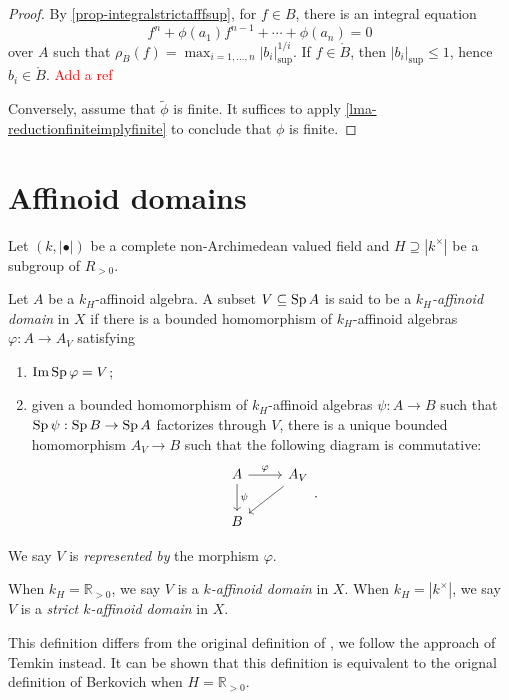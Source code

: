 \begin{proof}
    By \cref{prop-integralstrictafffsup}, for $f\in B$, there is an integral equation 
    \[
        f^n+\phi(a_1)f^{n-1}+\cdots+\phi(a_n)=0
    \]
    over $A$ such that $\rho_B(f)=\max_{i=1,\ldots,n}|b_i|_{\sup}^{1/i}$. If $f\in \mathring{B}$, then $|b_i|_{\sup}\leq 1$, hence $b_i\in \mathring{B}$. \textcolor{red}{Add a ref}

    Conversely, assume that $\tilde{\phi}$ is finite. It suffices to apply \cref{lma-reductionfiniteimplyfinite} to conclude that $\phi$ is finite.
\end{proof}


\section{Affinoid domains}
Let $(k,|\bullet|)$ be a complete non-Archimedean valued field and $H\supseteq |k^{\times}|$ be a subgroup of $R_{>0}$.

\begin{definition}\label{def-affinoiddomain}
    Let $A$ be a $k_H$-affinoid algebra. A subset $V\subseteq \operatorname{Sp} A$ is said to be a \emph{$k_H$-affinoid domain} in $X$ if there is a bounded homomorphism of $k_H$-affinoid algebras $\varphi:A\rightarrow A_V$ satisfying 
    \begin{enumerate}
        \item $\operatorname{Im} \operatorname{Sp}\varphi=V$;
        \item given a bounded homomorphism of $k_H$-affinoid algebras $\psi:A\rightarrow B$ such that $\operatorname{Sp} \psi:\operatorname{Sp} B\rightarrow \operatorname{Sp} A$ factorizes through $V$, there is a unique bounded homomorphism $A_V\rightarrow B$ such that the following diagram is commutative:
        \[
            \begin{tikzcd}
                A \arrow[r, "\varphi"] \arrow[d, "\psi"] & A_V \arrow[ld] \\
                B                                        &               
            \end{tikzcd}.
        \]
    \end{enumerate}
    We say $V$ is \emph{represented by} the morphism $\varphi$.

    When $k_H=\mathbb{R}_{>0}$, we say $V$ is a \emph{$k$-affinoid domain} in $X$. When $k_H=|k^{\times}|$, we say $V$ is a \emph{strict $k$-affinoid domain} in $X$.
\end{definition}
\begin{remark}
    This definition differs from the original definition of \cite{Berk12}, we follow the approach of Temkin instead. It can be shown that this definition is equivalent to the orignal definition of Berkovich when $H=\mathbb{R}_{>0}$.
\end{remark}

